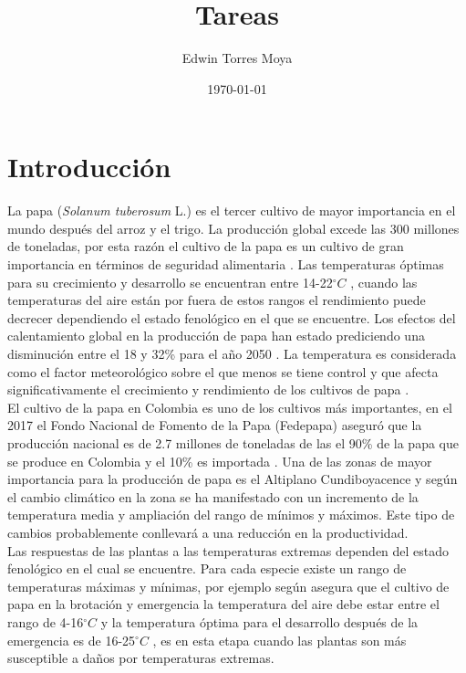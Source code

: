 \documentclass[11pt]{article}
\def\celc{$^{\circ}C$ }%
\begin{document}
\title{Tareas}
\author{Edwin Torres Moya}
\date{\today}
\maketitle

\tableofcontents
\newpage

\section{Introducción}

La papa (\textit{Solanum tuberosum} L.) es el tercer cultivo de mayor importancia en el mundo después del arroz y el trigo. La producción global excede las 300 millones de toneladas, por esta razón el cultivo de la papa es un cultivo de gran importancia en términos de seguridad alimentaria \citep{birch2012crops}. Las temperaturas óptimas para su crecimiento y desarrollo se encuentran entre 14-22\celc, cuando las temperaturas del aire están por fuera de estos rangos el rendimiento puede decrecer dependiendo el estado fenológico en el que se encuentre. Los efectos del calentamiento global en la producción de papa han estado prediciendo una disminución entre el 18 y 32\% para el año 2050 \citep{hijmans2003effect}. La temperatura es considerada como el factor meteorológico sobre el que menos se tiene control y que afecta significativamente el crecimiento y rendimiento de los cultivos de papa \citep{hancock2014physiological}.\\

El cultivo de la papa en Colombia es uno de los cultivos más importantes, en el 2017 el Fondo Nacional de Fomento de la Papa (Fedepapa) aseguró que la producción nacional es de 2.7 millones de toneladas de las el 90\% de la papa que se produce en Colombia y el 10\% es importada \citep{Portafolio2017}. Una de las zonas de mayor importancia para la producción de papa es el Altiplano Cundiboyacence y según \citet{Barrientos2014} el cambio climático en la zona se ha manifestado con un incremento de la temperatura media y ampliación del rango de mínimos y máximos. Este tipo de cambios probablemente conllevará a una reducción en la productividad.\\

Las respuestas de las plantas a las temperaturas extremas dependen del estado fenológico en el cual se encuentre. Para cada especie existe un rango de temperaturas máximas y mínimas, por ejemplo según \citet{Hatfield2008} asegura que el cultivo de papa en la brotación y emergencia la temperatura del aire debe estar entre el rango de 4-16\celc y la temperatura óptima para el desarrollo después de la emergencia es de 16-25\celc, es en esta etapa cuando las plantas son más susceptible a daños por temperaturas extremas.
\end{document}
